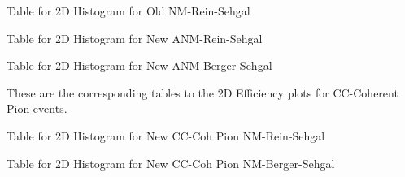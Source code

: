 \documentclass[11pt]{article}
\begin{document}
\newpage
\begin{landscape}
\begin{table}
\centering
\caption{Table for 2D Histogram for Old NM-Rein-Sehgal}
\begin{adjustbox}{width=\paperwidth}
\end{adjustbox}
\end{table}
\end{landscape}

\newpage
\begin{landscape}
\begin{table}
\centering
\caption{Table for 2D Histogram for New ANM-Rein-Sehgal}
\begin{adjustbox}{width=\paperwidth}
\end{adjustbox}
\end{table}
\end{landscape}

\newpage
\begin{landscape}
\begin{table}
\centering
\caption{Table for 2D Histogram for New ANM-Berger-Sehgal}
\begin{adjustbox}{width=\paperwidth}
\end{adjustbox}
\end{table}
\end{landscape}





These are the corresponding tables to the 2D Efficiency plots for CC-Coherent Pion events.

\newpage
\begin{landscape}
\begin{table}
\centering
\caption{Table for 2D Histogram for New CC-Coh Pion NM-Rein-Sehgal}
\begin{adjustbox}{width=\paperwidth}
\end{adjustbox}
\end{table}
\end{landscape}

\newpage
\begin{landscape}
\begin{table}
\centering
\caption{Table for 2D Histogram for New CC-Coh Pion NM-Berger-Sehgal}
\begin{adjustbox}{width=\paperwidth}
\end{adjustbox}
\end{table}
\end{landscape}
\end{document}
